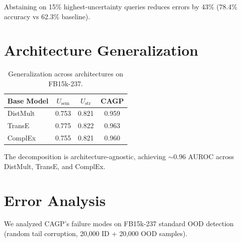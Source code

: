 \documentclass[accepted]{uai2024}  %
\begin{document}
Abstaining on 15\% highest-uncertainty queries reduces errors by 43\% (78.4\% accuracy vs 62.3\% baseline).

\section{Architecture Generalization}
\label{app:architectures}

\begin{table}[h]
\centering
\caption{Generalization across architectures on FB15k-237.}
\begin{tabular}{lccc}
\toprule
Base Model & $U_{\text{sem}}$ & $U_{\text{str}}$ & CAGP \\
\midrule
DistMult & 0.753 & 0.821 & 0.959 \\
TransE & 0.775 & 0.822 & 0.963 \\
ComplEx & 0.755 & 0.821 & 0.960 \\
\bottomrule
\end{tabular}
\end{table}

The decomposition is architecture-agnostic, achieving $\sim$0.96 AUROC across DistMult, TransE, and ComplEx.

\section{Error Analysis}
\label{app:error_analysis}

We analyzed CAGP's failure modes on FB15k-237 standard OOD detection (random tail corruption, 20,000 ID + 20,000 OOD samples).
\end{document}
